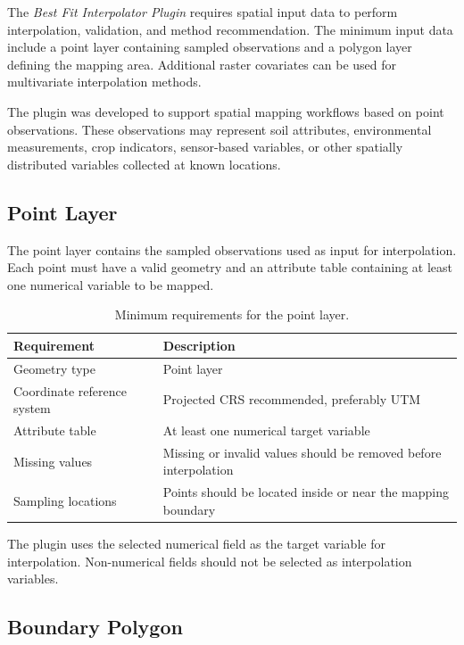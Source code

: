 \documentclass[11pt,a4paper]{article}
\begin{document}
The \textit{Best Fit Interpolator Plugin} requires spatial input data to perform interpolation, validation, and method recommendation. The minimum input data include a point layer containing sampled observations and a polygon layer defining the mapping area. Additional raster covariates can be used for multivariate interpolation methods.

The plugin was developed to support spatial mapping workflows based on point observations. These observations may represent soil attributes, environmental measurements, crop indicators, sensor-based variables, or other spatially distributed variables collected at known locations.

\subsection{Point Layer}

The point layer contains the sampled observations used as input for interpolation. Each point must have a valid geometry and an attribute table containing at least one numerical variable to be mapped.

\begin{table}[H]
\centering
\caption{Minimum requirements for the point layer.}
\begin{tabular}{P{5cm} P{8cm}}
\toprule
\textbf{Requirement} & \textbf{Description} \\
\midrule
Geometry type & Point layer \\
Coordinate reference system & Projected CRS recommended, preferably UTM \\
Attribute table & At least one numerical target variable \\
Missing values & Missing or invalid values should be removed before interpolation \\
Sampling locations & Points should be located inside or near the mapping boundary \\
\bottomrule
\end{tabular}
\end{table}

\begin{infobox}
The plugin uses the selected numerical field as the target variable for interpolation. Non-numerical fields should not be selected as interpolation variables.
\end{infobox}

\subsection{Boundary Polygon}
\end{document}
